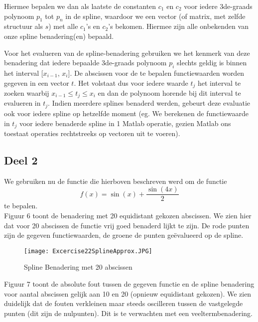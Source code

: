 \documentclass[a4paper]{article}
\begin{document}
Hiermee bepalen we dan als laatste de constanten $c_{1}$ en $c_{2}$ voor iedere 3de-graads polynoom $p_{1}$ tot $p_{n}$ in de spline, waardoor we een vector (of matrix, met zelfde structuur als $s$) met alle $c_{1}$’s en $c_{2}$’s bekomen. Hiermee zijn alle onbekenden van onze spline benadering(en) bepaald.

Voor het evalueren van de spline-benadering gebruiken we het kenmerk van deze benadering dat iedere bepaalde 3de-graads polynoom $p_{i}$ slechts geldig is binnen het interval [$x_{i-1}$, $x_{i}$].
De abscissen voor de te bepalen functiewaarden worden gegeven in een vector $t$.
Het volstaat dus voor iedere waarde $t_{j}$ het interval te zoeken waarbij $x_{i-1} \leq t_{j} \leq x_{i}$ en dan de polynoom horende bij dit interval te evalueren in $t_{j}$. Indien meerdere splines benaderd werden, gebeurt deze evaluatie ook voor iedere spline op hetzelfde moment (eg. We berekenen de functiewaarde in $t_{j}$ voor iedere benaderde spline in 1 Matlab operatie, gezien Matlab ons toestaat operaties rechtstreeks op vectoren uit te voeren).

\subsection{Deel 2}
We gebruiken nu de functie die hierboven beschreven werd om de functie
\begin{equation}
f(x) = \sin(x) + \frac{\sin(4x)}{2}
\end{equation}
te bepalen.\\
Figuur 6 toont de benadering met 20 equidistant gekozen abscissen.
We zien hier dat voor 20 abscissen de functie vrij goed benaderd lijkt te zijn. De rode punten zijn de gegeven functiewaarden, de groene de punten geëvalueerd op de spline.
\begin{figure}
\caption{Spline Benadering met 20 abscissen}
\texttt{[image: Excercise22SplineApprox.JPG]}
\end{figure}

Figuur 7 toont de absolute fout tussen de gegeven functie en de spline benadering voor aantal abscissen gelijk aan 10 en 20 (opnieuw equidistant gekozen). We zien duidelijk dat de fouten verkleinen maar steeds oscilleren tussen de vastgelegde punten (dit zijn de nulpunten). Dit is te verwachten met een veeltermbenadering.
\end{document}
